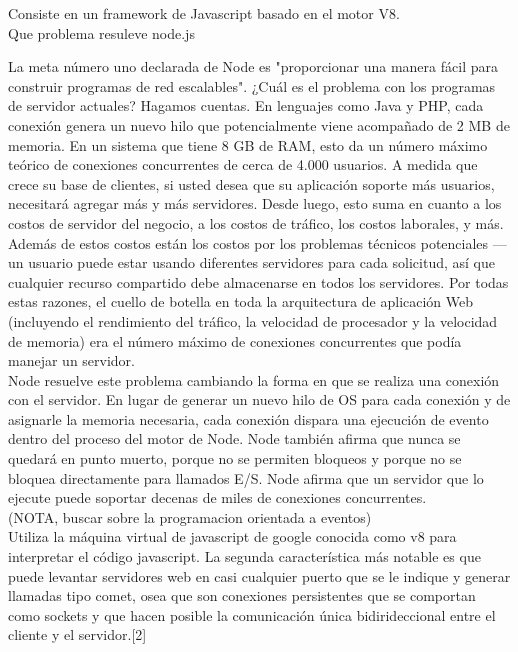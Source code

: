 
Consiste en un framework de Javascript basado en el motor V8.\\

Que problema resuleve node.js

La meta número uno declarada de Node es "proporcionar una manera fácil para construir programas de 
red escalables". ¿Cuál es el problema con los programas de servidor actuales? Hagamos cuentas. En lenguajes 
como Java y PHP, cada conexión genera un nuevo hilo que potencialmente viene acompañado de 2 MB de memoria. 
En un sistema que tiene 8 GB de RAM, esto da un número máximo teórico de conexiones concurrentes de cerca de 
4.000 usuarios. A medida que crece su base de clientes, si usted desea que su aplicación soporte más usuarios,
necesitará agregar más y más servidores. Desde luego, esto suma en cuanto a los costos de servidor del negocio, 
a los costos de tráfico, los costos laborales, y más. Además de estos costos están los costos por los problemas 
técnicos potenciales — un usuario puede estar usando diferentes servidores para cada solicitud, así que cualquier 
recurso compartido debe almacenarse en todos los servidores. Por todas estas razones, el cuello de botella en 
toda la arquitectura de aplicación Web (incluyendo el rendimiento del tráfico, la velocidad de procesador y la 
velocidad de memoria) era el número máximo de conexiones concurrentes que podía manejar un servidor.\\

Node resuelve este problema cambiando la forma en que se realiza una conexión con el servidor. En lugar de 
generar un nuevo hilo de OS para cada conexión y de asignarle la memoria necesaria, cada conexión dispara una 
ejecución de evento dentro del proceso del motor de Node. Node también afirma que nunca se quedará en punto muerto, 
porque no se permiten bloqueos y porque no se bloquea directamente para llamados E/S. Node afirma que un servidor que 
lo ejecute puede soportar decenas de miles de conexiones concurrentes.\\

(NOTA, buscar sobre la programacion orientada a eventos)\\

Utiliza la máquina virtual de javascript de google conocida como v8 para interpretar el código javascript. 
La segunda característica más notable es que puede levantar servidores web en casi cualquier puerto que se le indique 
y generar llamadas tipo comet, osea que son conexiones persistentes que se comportan como sockets y que hacen posible 
la comunicación única bidirideccional entre el cliente y el servidor.[2]\\

